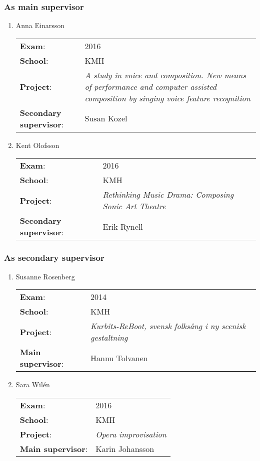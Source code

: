 \subsubsection*{\textsf{As main supervisor}}
  \begin{enumerate}[label=\arabic*]
  \item Anna Einarsson

    \begin{tabular}[c]{p{3.3cm} p{7cm}}
      \textbf{Exam}: & 2016 \\
      \textbf{School}: & KMH \\
      \textbf{Project}: & \emph{A study in voice and composition. New means of performance and computer assisted composition by singing voice feature recognition} \\
      \textbf{Secondary supervisor}: & Susan Kozel \\
    \end{tabular}

  \item Kent Olofsson

    \begin{tabular}[c]{p{3.3cm} p{7cm}}
      \textbf{Exam}: & 2016 \\
      \textbf{School}: & KMH \\
      \textbf{Project}: & \emph{Rethinking Music Drama: Composing Sonic Art Theatre} \\
      \textbf{Secondary supervisor}: & Erik Rynell \\
    \end{tabular}

  \end{enumerate}
\subsubsection*{\textsf{As secondary supervisor}}

  \begin{enumerate}[start=3]
  \item Susanne Rosenberg

    \begin{tabular}[c]{p{3.3cm} p{7cm}}
      \textbf{Exam}: & 2014 \\
      \textbf{School}: & KMH \\
      \textbf{Project}: & \emph{Kurbits-ReBoot, svensk folksång i ny scenisk gestaltning} \\
      \textbf{Main supervisor}: & Hannu Tolvanen \\
    \end{tabular}
  \item Sara Wilén

    \begin{tabular}[c]{p{3.3cm} p{7cm}}
      \textbf{Exam}: & 2016 \\
      \textbf{School}: & KMH \\
      \textbf{Project}: & \emph{Opera improvisation} \\
      \textbf{Main supervisor}: & Karin Johansson \\
    \end{tabular}

  \end{enumerate}


